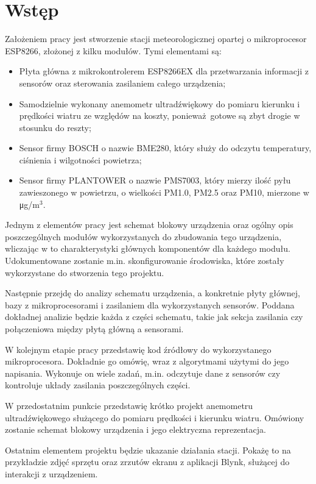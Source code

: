 \documentclass[12pt,a4paper,oneside]{memoir}
\begin{document}
\chapter{Wstęp}
	\hspace{\parindent} Założeniem pracy jest stworzenie stacji meteorologicznej opartej o mikroprocesor ESP8266, złożonej z kilku modułów. Tymi elementami są:
	\begin{itemize}{}{}
		\item Płyta główna z mikrokontrolerem ESP8266EX dla przetwarzania informacji z sensorów oraz sterowania zasilaniem całego urządzenia;
		\item Samodzielnie wykonany anemometr ultradźwiękowy do pomiaru kierunku i prędkości wiatru ze względów na koszty, ponieważ gotowe są zbyt drogie w stosunku do reszty;
		\item Sensor firmy BOSCH o nazwie BME280, który służy do odczytu temperatury, ciśnienia i wilgotności powietrza;
		\item Sensor firmy PLANTOWER o nazwie PMS7003, który mierzy ilość pyłu zawieszonego w powietrzu, o wielkości PM1.0, PM2.5 oraz PM10, mierzone w \si\micro g/m$^{3}$.
	\end{itemize}
	\par Jednym z elementów pracy jest schemat blokowy urządzenia oraz ogólny opis poszczególnych modułów wykorzystanych do zbudowania tego urządzenia, wliczając w to charakterystyki głównych komponentów dla każdego modułu. Udokumentowane zostanie m.in. skonfigurowanie środowiska, które zostały wykorzystane do stworzenia tego projektu.
	\par Następnie przejdę do analizy schematu urządzenia, a konkretnie płyty głównej, bazy z mikroprocesorami i zasilaniem dla wykorzystanych sensorów. Poddana dokładnej analizie będzie każda z części schematu, takie jak sekcja zasilania czy połączeniowa między płytą główną a sensorami.
	\par W kolejnym etapie pracy przedstawię kod źródłowy do wykorzystanego mikroprocesora. Dokładnie go omówię, wraz z algorytmami użytymi do jego napisania. Wykonuje on wiele zadań, m.in. odczytuje dane z sensorów czy kontroluje układy zasilania poszczególnych części.
	\par W przedostatnim punkcie przedstawię krótko projekt anemometru ultradźwiękowego służącego do pomiaru prędkości i kierunku wiatru. Omówiony zostanie schemat blokowy urządzenia i jego elektryczna reprezentacja.
	\par Ostatnim elementem projektu będzie ukazanie działania stacji. Pokażę to na przykładzie zdjęć sprzętu oraz zrzutów ekranu z aplikacji Blynk, służącej do interakcji z urządzeniem.
\end{document}
